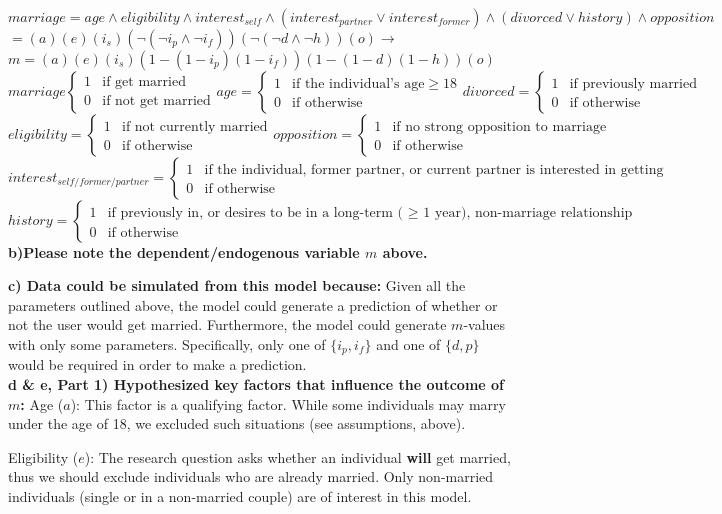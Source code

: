 \documentclass{report}
\newcommand{\twopartdef}[4]
{
	\left\{
		\begin{array}{ll}
			#1 & \mbox{if } #2 \\
			#3 & \mbox{if } #4
		\end{array}
	\right.
}
\begin{document}
\


\noindent $marriage = age \wedge eligibility \wedge  interest_{self} \wedge (interest_{partner} \vee interest_{former}) \wedge ( divorced \vee history ) \wedge opposition $ \\
$ = (a)(e)(i_s)(\neg(\neg i_p \wedge \neg i_f))(\neg(\neg d \wedge \neg h))(o) \rightarrow$ \boldmath$ m = (a)(e)(i_s)(1-(1-i_p)(1-i_f))(1-(1-d)(1-h))(o)$ \unboldmath \\

\noindent $marriage \twopartdef {1} {\text{get married}} {0} {\text{not get married}}  age = \twopartdef {1} { \text{the individual's age} \geq 18} {0} { \text{otherwise}} divorced = \twopartdef {1} { \text{previously married}} {0} { \text{otherwise}} $\\
$eligibility = \twopartdef {1} { \text{not currently married}} {0} { \text{otherwise}} opposition = \twopartdef {1} { \text{no strong opposition to marriage}} {0} { \text{otherwise}} $ \\
$interest_{self/former/ partner} = \twopartdef {1} { \text{the individual, former partner, or current partner is interested in getting married}} {0} { \text{otherwise}} $ \\
$history = \twopartdef {1} { \text{previously in, or desires to be in a long-term ( $\geq$ 1 year), non-marriage relationship}} {0} { \text{otherwise}} $ \\

\textbf{b)Please note the dependent/endogenous variable $m$ above.} 

\textbf{c) Data could be simulated from this model because:} Given all the parameters outlined above, the model could generate a prediction of whether or not the user would get married. Furthermore, the model could generate $m$-values with only some parameters. Specifically, only one of $\{i_p, i_f\}$ and one of $\{d, p\}$ would be required in order to make a prediction. \\

\textbf{d \& e, Part 1) Hypothesized key factors that influence the outcome of $m$:}
Age ($a$): This factor is a qualifying factor. While some individuals may marry under the age of 18, we excluded such situations (see assumptions, above). 

Eligibility ($e$): The research question asks whether an individual \textbf{will} get married, thus we should exclude individuals who are already married. Only non-married individuals (single or in a non-married couple) are of interest in this model. 
\end{document}
